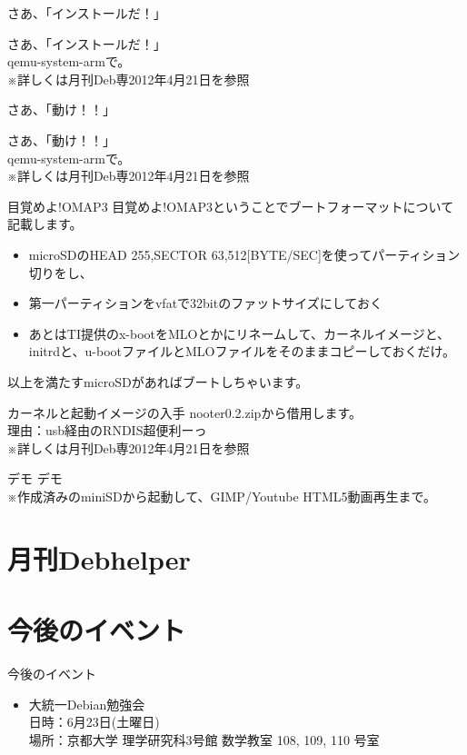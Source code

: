 \begin{frame}{さあ、「インストールだ！」}

さあ、「インストールだ！」\\
 qemu-system-armで。\\
※詳しくは月刊Deb専2012年4月21日を参照
\end{frame}

\begin{frame}{さあ、「動け！！」}

さあ、「動け！！」\\
 qemu-system-armで。\\
※詳しくは月刊Deb専2012年4月21日を参照
\end{frame}

\begin{frame}{目覚めよ!OMAP3}
目覚めよ!OMAP3ということでブートフォーマットについて記載します。
\begin{itemize}
\item microSDのHEAD 255,SECTOR 63,512[BYTE/SEC]を使ってパーティション切りをし、
\item 第一パーティションをvfatで32bitのファットサイズにしておく
\item あとはTI提供のx-bootをMLOとかにリネームして、カーネルイメージと、initrdと、u-bootファイルとMLOファイルをそのままコピーしておくだけ。
\end{itemize}
以上を満たすmicroSDがあればブートしちゃいます。
\end{frame}

\begin{frame}{カーネルと起動イメージの入手}
nooter0.2.zipから借用します。\\
理由：usb経由のRNDIS超便利ーっ\\
※詳しくは月刊Deb専2012年4月21日を参照
\end{frame}

\begin{frame}{デモ}
デモ\\
※作成済みのminiSDから起動して、GIMP/Youtube HTML5動画再生まで。
\end{frame}


\section{月刊Debhelper}

\section{今後のイベント}
\begin{frame}{今後のイベント}
\begin{itemize}
\item 大統一Debian勉強会\\
日時：6月23日(土曜日)\\
場所：京都大学 理学研究科3号館 数学教室 108, 109, 110 号室
\end{itemize}
\end{frame}

